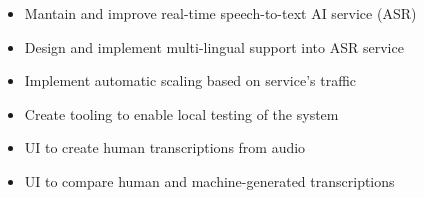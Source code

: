 \documentclass[10pt,letterpaper,ragged2d,withhyper]{altacv}
\begin{document}
\begin{paracol}{2}

\begin{itemize}
\item Mantain and improve real-time speech-to-text AI service (ASR)
\item Design and implement multi-lingual support into ASR service
\item Implement automatic scaling based on service's traffic
\item Create tooling to enable local testing of the system
\item UI to create human transcriptions from audio
\item UI to compare human and machine-generated transcriptions
\end{itemize}


\divider


\end{paracol}
\end{document}
